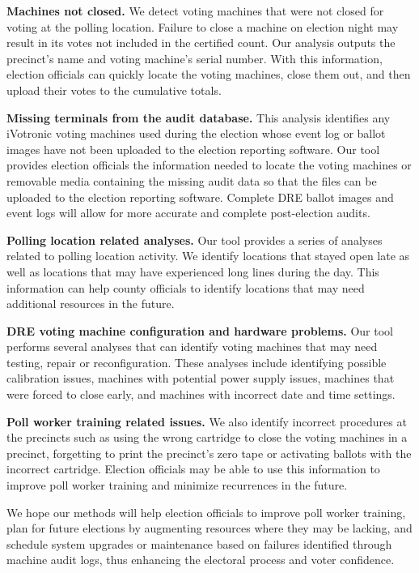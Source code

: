 \textbf{Machines not closed.} We detect voting machines that were not closed for voting at the polling location. Failure to close a machine on election night may result in its votes not included in the certified count. Our analysis outputs the precinct's name and voting machine's serial number. With this information, election officials can quickly locate the voting machines, close them out, and then upload their votes to the cumulative totals.

\textbf{Missing terminals from the audit database.} This analysis identifies any iVotronic voting machines used during the election whose event log or ballot images have not been uploaded to the election reporting software. Our tool provides election officials the information needed to locate the voting machines or removable media containing the missing audit data so that the files can be uploaded to the election reporting software. Complete DRE ballot images and event logs will allow for more accurate and complete post-election audits.

\textbf{Polling location related analyses.} Our tool provides a series of analyses related to polling location activity. We identify locations that stayed open late as well as locations that may have experienced long lines during the day. This information can help county officials to identify locations that may need additional resources in the future. 

\textbf{DRE voting machine configuration and hardware problems.} Our tool performs several analyses that can identify  voting machines that may need testing, repair or reconfiguration. These analyses include identifying possible calibration issues, machines with potential power supply issues, machines that were forced to close early, and machines with incorrect date and time settings.

\textbf{Poll worker training related issues.} We also identify incorrect procedures at the precincts such as using the wrong cartridge to close the voting machines in a precinct, forgetting to print the precinct's zero tape or activating ballots with the incorrect cartridge. Election officials may be able to use this information to improve poll worker training and minimize recurrences in the future.

We hope our methods will help election officials to improve poll worker training, plan for future elections by augmenting resources where they may be lacking, and schedule system upgrades or maintenance based on failures identified through machine audit logs, thus enhancing the electoral process and voter confidence.

